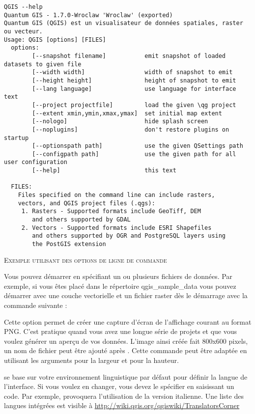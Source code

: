 \small
\begin{verbatim}
QGIS --help
Quantum GIS - 1.7.0-Wroclaw 'Wroclaw' (exported)
Quantum GIS (QGIS) est un visualisateur de données spatiales, raster ou vecteur.
Usage: QGIS [options] [FILES]
  options:
		[--snapshot filename]           emit snapshot of loaded datasets to given file
		[--width width]                 width of snapshot to emit
		[--height height]               height of snapshot to emit
		[--lang language]               use language for interface text
		[--project projectfile]         load the given \qg project
		[--extent xmin,ymin,xmax,ymax]  set initial map extent
		[--nologo]                      hide splash screen
		[--noplugins]                   don't restore plugins on startup
		[--optionspath path]            use the given QSettings path
		[--configpath path]             use the given path for all user configuration
		[--help]                        this text

  FILES:
    Files specified on the command line can include rasters,
    vectors, and QGIS project files (.qgs):
     1. Rasters - Supported formats include GeoTiff, DEM
        and others supported by GDAL
     2. Vectors - Supported formats include ESRI Shapefiles
        and others supported by OGR and PostgreSQL layers using
        the PostGIS extension
\end{verbatim}
\normalsize

\begin{Tip} \caption{\textsc{Exemple utilisant des options de ligne de commande}}
Vous pouvez démarrer \qg en spécifiant un ou plusieurs fichiers de données. Par exemple, si vous êtes placé dans le répertoire qgis\_sample\_data vous pouvez démarrer \qg avec une couche vectorielle et un fichier raster dès le démarrage avec la commande suivante : 
\end{Tip}

Cette option permet de créer une capture d'écran de l'affichage courant au format PNG. C'est pratique quand vous avez une longue série de projets et que vous voulez générer un aperçu de vos données. L'image ainsi créée fait 800x600 pixels, un nom de fichier peut être ajouté après . Cette commande peut être adaptée en utilisant les arguments  pour la largeur et  pour la hauteur.

\qg se base sur votre environnement linguistique par défaut pour définir la langue de l'interface. Si vous voulez en changer, vous devez le spécifier en saisissant un code. 
Par exemple,  provoquera l'utilisation de la version italienne. Une liste des langues intégrées est visible à \url{http://wiki.qgis.org/qgiswiki/TranslatorsCorner}

